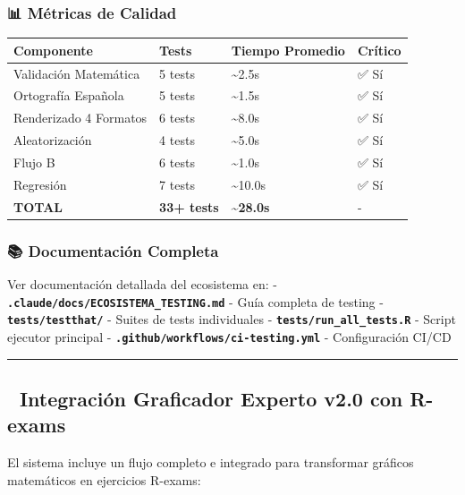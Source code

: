 \documentclass[
]{article}
\begin{document}
\subsubsection{📊 Métricas de Calidad}\label{muxe9tricas-de-calidad}

\begin{longtable}[]{@{}llll@{}}
\toprule\noalign{}
Componente & Tests & Tiempo Promedio & Crítico \\
\midrule\noalign{}
\endhead
\bottomrule\noalign{}
\endlastfoot
Validación Matemática & 5 tests & \textasciitilde2.5s & ✅ Sí \\
Ortografía Española & 5 tests & \textasciitilde1.5s & ✅ Sí \\
Renderizado 4 Formatos & 6 tests & \textasciitilde8.0s & ✅ Sí \\
Aleatorización & 4 tests & \textasciitilde5.0s & ✅ Sí \\
Flujo B & 6 tests & \textasciitilde1.0s & ✅ Sí \\
Regresión & 7 tests & \textasciitilde10.0s & ✅ Sí \\
\textbf{TOTAL} & \textbf{33+ tests} & \textbf{\textasciitilde28.0s} &
- \\
\end{longtable}

\subsubsection{📚 Documentación
Completa}\label{documentaciuxf3n-completa}

Ver documentación detallada del ecosistema en: -
\textbf{\texttt{.claude/docs/ECOSISTEMA\_TESTING.md}} - Guía completa de
testing - \textbf{\texttt{tests/testthat/}} - Suites de tests
individuales - \textbf{\texttt{tests/run\_all\_tests.R}} - Script
ejecutor principal - \textbf{\texttt{.github/workflows/ci-testing.yml}}
- Configuración CI/CD

\begin{center}\rule{0.5\linewidth}{0.5pt}\end{center}

\subsection{\texorpdfstring{🔗 \textbf{Integración Graficador Experto
v2.0 con
R-exams}}{🔗 Integración Graficador Experto v2.0 con R-exams}}\label{integraciuxf3n-graficador-experto-v2.0-con-r-exams}

El sistema incluye un flujo completo e integrado para transformar
gráficos matemáticos en ejercicios R-exams:
\end{document}
